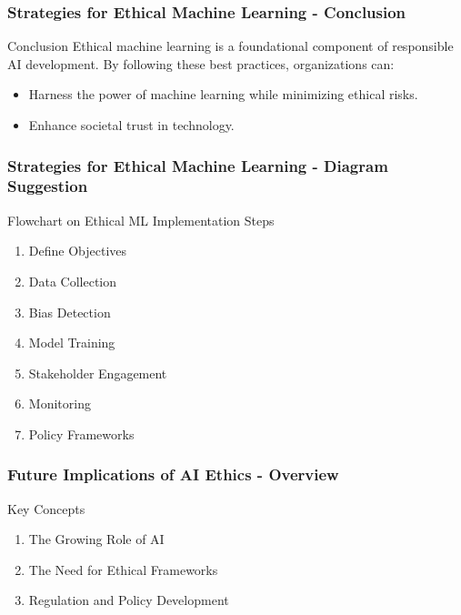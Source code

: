 \documentclass[aspectratio=169]{beamer}
\begin{document}
\begin{frame}[fragile]
    \frametitle{Strategies for Ethical Machine Learning - Conclusion}
    \begin{block}{Conclusion}
        Ethical machine learning is a foundational component of responsible AI development. By following these best practices, organizations can: 
        \begin{itemize}
            \item Harness the power of machine learning while minimizing ethical risks.
            \item Enhance societal trust in technology.
        \end{itemize}
    \end{block}
\end{frame}

\begin{frame}[fragile]
    \frametitle{Strategies for Ethical Machine Learning - Diagram Suggestion}
    \begin{block}{Flowchart on Ethical ML Implementation Steps}
        \begin{enumerate}
            \item Define Objectives
            \item Data Collection
            \item Bias Detection
            \item Model Training
            \item Stakeholder Engagement
            \item Monitoring
            \item Policy Frameworks
        \end{enumerate}
    \end{block}
\end{frame}

\begin{frame}[fragile]
  \frametitle{Future Implications of AI Ethics - Overview}
  \begin{block}{Key Concepts}
    \begin{enumerate}
      \item The Growing Role of AI
      \item The Need for Ethical Frameworks
      \item Regulation and Policy Development
    \end{enumerate}
  \end{block}
\end{frame}
\end{document}
